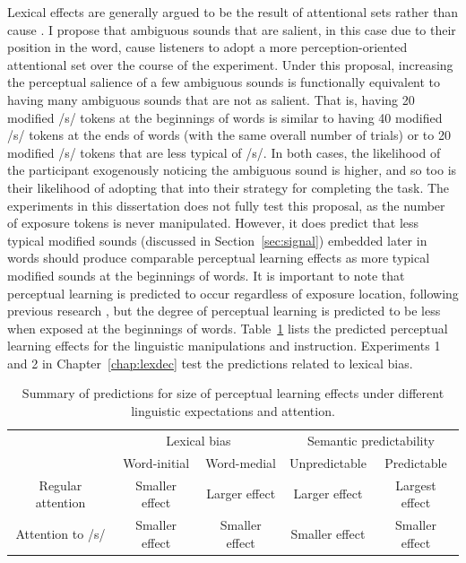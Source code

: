 Lexical effects are generally argued to be the result of attentional sets rather than cause \citep{Cutler1987, Pitt2012}.
I propose that ambiguous sounds that are salient, in this case due to their position in the word, cause listeners to adopt a more perception-oriented attentional set over the course of the experiment.
Under this proposal, increasing the perceptual salience of a few ambiguous sounds is functionally equivalent to having many ambiguous sounds that are not as salient.
That is, having 20 modified /s/ tokens at the beginnings of words is similar to having 40 modified /s/ tokens at the ends of words (with the same overall number of trials) or to 20 modified /s/ tokens that are less typical of /s/.
In both cases, the likelihood of the participant exogenously noticing the ambiguous sound is higher, and so too is their likelihood of adopting that into their strategy for completing the task.
The experiments in this dissertation does not fully test this proposal, as the number of exposure tokens is never manipulated.
However, it does predict that less typical modified sounds (discussed in Section~\ref{sec:signal}) embedded later in words should produce comparable perceptual learning effects as more typical modified sounds at the beginnings of words.
It is important to note that perceptual learning is predicted to occur regardless of exposure location, following previous research \citep{Norris2003,Kraljic2005, Kraljic2008, Kraljic2008,Clare2014}, but the degree of perceptual learning is predicted to be less when exposed at the beginnings of words.
Table~\ref{tbl:predictions} lists the predicted perceptual learning effects for the linguistic manipulations and instruction.
Experiments 1 and 2  in Chapter~\ref{chap:lexdec} test the predictions related to lexical bias.

\begin{table}[ht]
\caption{Summary of predictions for size of perceptual learning effects under different linguistic expectations and attention.}
\label{tbl:predictions}
\centering
\small
\begin{tabular}{cccccc}
\toprule
                  &                   & \multicolumn{2}{c}{Lexical bias} & \multicolumn{2}{c}{Semantic predictability} \\
\cmidrule(r){3-4}
\cmidrule(r){5-6}
                  &                   & Word-initial    & Word-medial    & Unpredictable        & Predictable          \\
\midrule
\multicolumn{2}{c}{Regular attention} & Smaller effect  & Larger effect  & Larger effect       & Largest effect        \\
\multicolumn{2}{c}{Attention to /s/}  & Smaller effect  & Smaller effect & Smaller effect       & Smaller effect  \\
\bottomrule    
\end{tabular}
\end{table}

